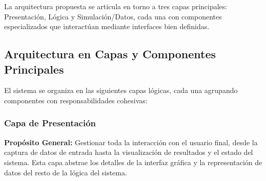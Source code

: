 La arquitectura propuesta se articula en torno a tres capas principales: Presentación, Lógica y Simulación/Datos, cada una con componentes especializados que interactúan mediante interfaces bien definidas.

\subsection{Arquitectura en Capas y Componentes Principales}

El sistema se organiza en las siguientes capas lógicas, cada una agrupando componentes con responsabilidades cohesivas:

\subsubsection{Capa de Presentación}
\textbf{Propósito General:} Gestionar toda la interacción con el usuario final, desde la captura de datos de entrada hasta la visualización de resultados y el estado del sistema. Esta capa abstrae los detalles de la interfaz gráfica y la representación de datos del resto de la lógica del sistema.

